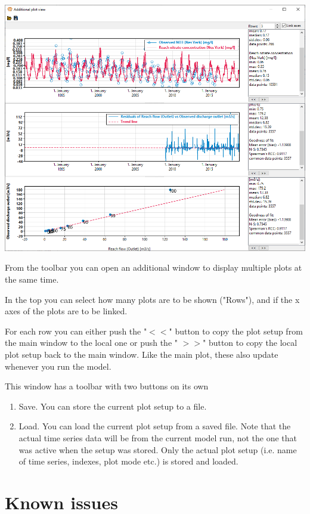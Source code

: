\documentclass[11pt]{article}
\theoremstyle{definition}
\begin{document}
\begin{center}
\includegraphics[width=\linewidth]{img/additionalplotview}
\end{center}

From the toolbar you can open an additional window to display multiple plots at the same time.

In the top you can select how many plots are to be shown ("Rows"), and if the x axes of the plots are to be linked.

For each row you can either push the "$<<$" button to copy the plot setup from the main window to the local one or push the " $>>$" button to copy the local plot setup back to the main window. Like the main plot, these also update whenever you run the model.

This window has a toolbar with two buttons on its own
\begin{enumerate}
\item Save. You can store the current plot setup to a file.
\item Load. You can load the current plot setup from a saved file. Note that the actual time series data will be from the current model run, not the one that was active when the setup was stored. Only the actual plot setup (i.e. name of time series, indexes, plot mode etc.) is stored and loaded.
\end{enumerate}

\section{Known issues}
\end{document}
